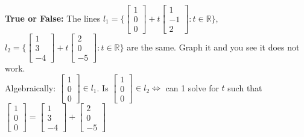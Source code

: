 \documentclass[11pt]{article}
\theoremstyle{plain}
\theoremstyle{remark}
\theoremstyle{plain}
\newcommand{\bd}{\textbf}
\newcommand{\rn}{\mathbb{R}}
\begin{document}
\begin{tcolorbox}[colback=magenta!5!white,colframe=magenta!75!black,title=Problem 4]
   \bd{True or False:} The lines $l_1=\{\begin{bmatrix}
       1\\0\\0
   \end{bmatrix}+t\begin{bmatrix}
       1\\-1\\2
   \end{bmatrix}:t\in\rn\}$, $l_2=\{\begin{bmatrix}
       1\\3\\-4
   \end{bmatrix}+t\begin{bmatrix}
       2\\0\\-5
   \end{bmatrix}:t\in\rn\}$ are the same. Graph it and you see it does not work.\\

   Algebraically:
   $\begin{bmatrix}
       1\\0\\0
   \end{bmatrix}\in l_1$. Is $\begin{bmatrix}
       1\\0\\0
   \end{bmatrix}\in l_2 \iff$ can 1 solve for $t$ such that $\begin{bmatrix}
       1\\0\\0
   \end{bmatrix}=\begin{bmatrix}
       1\\3\\-4
   \end{bmatrix}+\begin{bmatrix}
       2\\0\\-5
   \end{bmatrix}$
\end{tcolorbox}   
\end{document}
